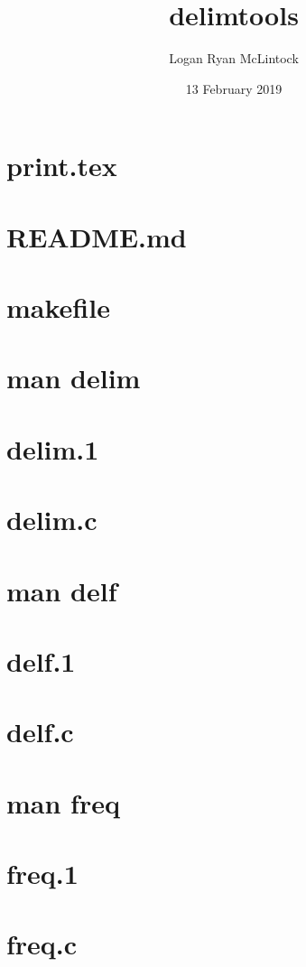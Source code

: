 \documentclass[titlepage, a4paper]{article}
\title{delimtools}
\date {13 February 2019}
\author{Logan Ryan McLintock}
\begin{document}
\maketitle

\tableofcontents
\newpage

\section{print.tex}
\newpage

\section{README.md}
\newpage

\section{makefile}
\newpage

\section{man delim}


\section{delim.1}
\newpage

\section{delim.c}
\newpage

\section{man delf}


\section{delf.1}
\newpage

\section{delf.c}
\newpage

\section{man freq}


\section{freq.1}
\newpage

\section{freq.c}
\end{document}

